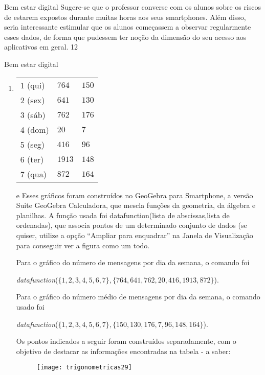\begin{sugestions}{Bem estar digital}
{
Sugere-se que o professor converse com os alunos sobre os riscos de estarem expostos durante muitas horas aos seus smartphones. Além disso, seria interessante estimular que os alunos começassem a observar regularmente esses dados, de forma que pudessem ter noção da dimensão do seu acesso aos aplicativos em geral.
}{1}{2}
\end{sugestions}
\clearmargin
\clearmargin
\marginpar{\vspace{.5em}}
\begin{answer}{Bem estar digital}
{
\begin{enumerate}[left=7.5pt, wide]
\item {}
{
\scalebox{.9}
{
\begin{tabular}{|e{.3\linewidth}|e{.3\linewidth}|e{.3\linewidth}|}
\hline
{} &  &  \tabularnewline
{} (qui) & $764$ & $150$ \tabularnewline
{} (sex) & $641$ & $130$ \tabularnewline
{} (sáb) & $762$ & $176$ \tabularnewline
{} (dom) & $20$ & $7$ \tabularnewline
{} (seg) & $416$ & $96$ \tabularnewline
{} (ter) & $1913$ & $148$ \tabularnewline
{} (qua) & $872$ & $164$ \tabularnewline
\hline
\end{tabular}
}
}
\item [\titem{b)} e \titem{c)}] Esses gráficos foram construídos no GeoGebra para Smartphone, a versão Suite GeoGebra
Calculadora, que mescla funções da geometria, da álgebra e planilhas. A função usada foi datafunction({lista de abscissas},{lista de ordenadas}), que associa pontos de um determinado conjunto de dados (se quiser, utilize a opção “Ampliar para enquadrar”{} na Janela de Visualização para conseguir ver a figura como um todo. 

Para o gráfico do número de mensagens por dia da semana, o comando foi 
\begin{center}
\textit{datafunction}($\{1, 2, 3, 4, 5, 6, 7\}, \{764, 641, 762, 20, 416,1913, 872\}$). 
\end{center}
Para o  gráfico do número médio de mensagens por dia da semana, o comando usado foi 
\begin{center}
\textit{datafunction}($\{1, 2, 3, 4, 5, 6, 7\}, \{150, 130, 176, 7, 96, 148, 164\}$).
\end{center}
 Os pontos indicados a seguir foram construídos separadamente, com o objetivo de destacar as informações encontradas na tabela - a saber:
\begin{multicols}{2}
\begin{figure}[H]
\centering
\texttt{[image: trigonometricas29]}


\end{figure}
\end{multicols}
\end{enumerate}}
\end{answer}
